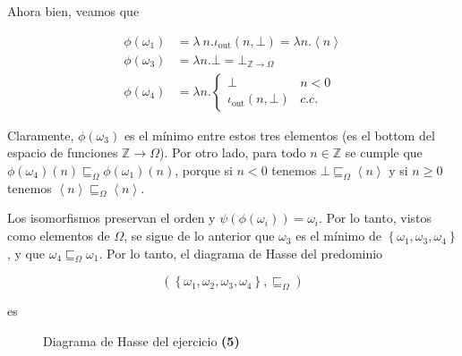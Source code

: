 \documentclass[article, 12pt]{article}
\begin{document}
Ahora bien, veamos que 

\begin{align*}
  \phi(\omega_1) &= \lambda ~ n . \iota_{\text{out}}(n, \bot ) = \lambda n .
  \left<n \right>\\ 
  \phi(\omega_3) &= \lambda n.\bot  = \bot_{\mathbb{Z}\to \Omega}\\ 
  \phi(\omega_4) &= \lambda n .\begin{cases}
    \bot & n < 0 \\ 
    \iota_{\text{out}}(n, \bot ) & c.c.
  \end{cases}
\end{align*}

Claramente, $\phi(\omega_3)$ es el mínimo entre estos tres elementos (es el
bottom del espacio de funciones $\mathbb{Z} \to \Omega$). Por otro lado, para
todo $n \in \mathbb{Z}$ se cumple que $\phi(\omega_4)(n) \sqsubseteq_{\Omega}
\phi(\omega_1)(n)$, porque si $n < 0$ tenemos $\bot  \sqsubseteq_\Omega \left<n \right>$ y si $n \geq
0$ tenemos $\left<n \right> \sqsubseteq_\Omega \left<n \right>$. 

Los isomorfismos preservan el orden y
$\psi(\phi(\omega_i)) = \omega_i$. Por lo tanto, vistos como elementos de
$\Omega$, se sigue de lo anterior que $\omega_3$ es el mínimo de $\left\{
\omega_1, \omega_3, \omega_4 \right\} $, y que $\omega_4 \sqsubseteq_\Omega
\omega_1$. Por lo tanto, el diagrama de Hasse del predominio 

\begin{equation*}
  \left( \left\{ \omega_1, \omega_2, \omega_3, \omega_4 \right\}, \sqsubseteq_\Omega  \right) 
\end{equation*}

es



\begin{figure}[!h]
\centering
{}
\caption{Diagrama de Hasse del ejercicio \textbf{(5)}}
\end{figure} 
\end{document}
